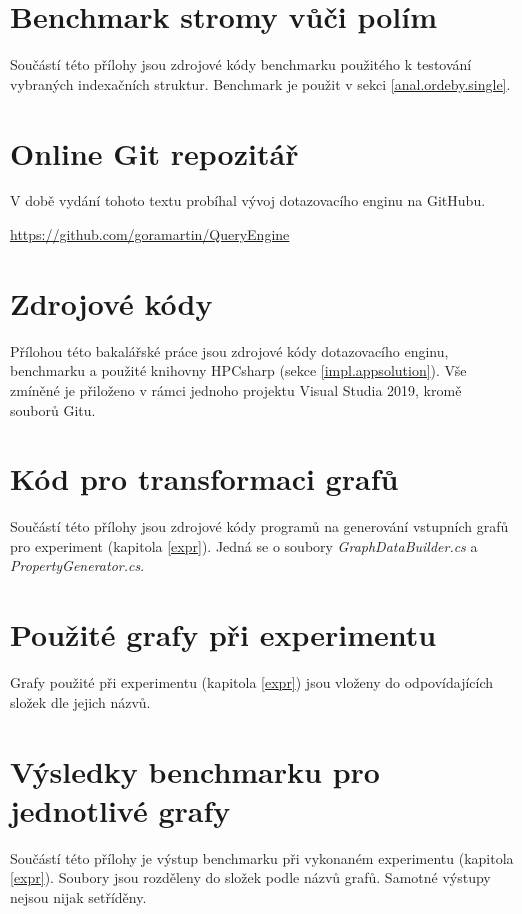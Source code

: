 \section{Benchmark stromy vůči polím}
\label{prilohy.benchtreevsarray}

Součástí této přílohy jsou zdrojové kódy benchmarku použitého k testování vybraných indexačních struktur.
Benchmark je použit v sekci \ref{anal.ordeby.single}.

\section{Online Git repozitář}
\label{prilohy.repo}

V době vydání tohoto textu probíhal vývoj dotazovacího enginu na GitHubu.

\begin{center}
\url{https://github.com/goramartin/QueryEngine}
\end{center}

\section{Zdrojové kódy}
\label{prilohy.kod}

Přílohou této bakalářské práce jsou zdrojové kódy dotazovacího enginu, benchmarku a použité knihovny HPCsharp (sekce \ref{impl.appsolution}).
Vše zmíněné je přiloženo v rámci jednoho projektu Visual Studia 2019, kromě souborů Gitu. 


\section{Kód pro transformaci grafů}
\label{prilohy.codetransform}

Součástí této přílohy jsou zdrojové kódy programů na generování vstupních grafů pro experiment (kapitola \ref{expr}). 
Jedná se o soubory \textit{GraphDataBuilder.cs} a \textit{PropertyGenerator.cs}.

\section{Použité grafy při experimentu}
\label{prilohy.grafy}

Grafy použité při experimentu (kapitola \ref{expr}) jsou vloženy do odpovídajících složek dle jejich názvů. 

\section{Výsledky benchmarku pro jednotlivé grafy}
\label{prilohy.grafyVysledky}

Součástí této přílohy je výstup benchmarku při vykonaném experimentu (kapitola \ref{expr}).
Soubory jsou rozděleny do složek podle názvů grafů.
Samotné výstupy nejsou nijak setříděny.


